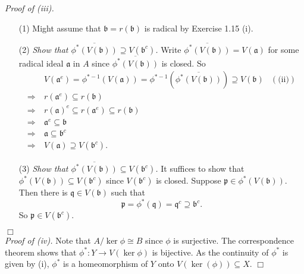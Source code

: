 \documentclass{article}
\begin{document}
\emph{Proof of (iii).}
\begin{enumerate}
\item[(1)]
  Might assume that $\mathfrak{b} = r(\mathfrak{b})$ is radical by Exercise 1.15 (i).

\item[(2)]
  \emph{Show that $\overline{\phi^{*}(V(\mathfrak{b}))} \supseteq V(\mathfrak{b}^{c})$.}
  Write $\overline{\phi^{*}(V(\mathfrak{b}))} = V(\mathfrak{a})$ for some radical ideal $\mathfrak{a}$ in $A$
  since $\overline{\phi^{*}(V(\mathfrak{b}))}$ is closed.
  So
  \begin{align*}
    &\:
    V(\mathfrak{a}^e)
    = \phi^{*-1}(V(\mathfrak{a}))
    = \phi^{*-1}(\overline{\phi^{*}(V(\mathfrak{b}))})
    \supseteq V(\mathfrak{b})
      &(\text{(ii)}) \\
    \Longrightarrow &\:
    r(\mathfrak{a}^e) \subseteq r(\mathfrak{b}) \\
    \Longrightarrow &\:
    r(\mathfrak{a})^e \subseteq r(\mathfrak{a}^e) \subseteq r(\mathfrak{b}) \\
    \Longrightarrow &\:
    \mathfrak{a}^e \subseteq \mathfrak{b} \\
    \Longrightarrow &\:
    \mathfrak{a} \subseteq \mathfrak{b}^c \\
    \Longrightarrow &\:
    V(\mathfrak{a}) \supseteq V(\mathfrak{b}^c).
  \end{align*}

\item[(3)]
  \emph{Show that $\overline{\phi^{*}(V(\mathfrak{b}))} \subseteq V(\mathfrak{b}^{c})$.}
  It suffices to show that $\phi^{*}(V(\mathfrak{b})) \subseteq V(\mathfrak{b}^{c})$
  since $V(\mathfrak{b}^{c})$ is closed.
  Suppose $\mathfrak{p} \in \phi^{*}(V(\mathfrak{b}))$.
  Then there is $\mathfrak{q} \in V(\mathfrak{b})$ such that
  \[
    \mathfrak{p} = \phi^{*}(\mathfrak{q}) = \mathfrak{q}^c \supseteq \mathfrak{b}^c.
  \]
  So $\mathfrak{p} \in V(\mathfrak{b}^c)$.
\end{enumerate}
$\Box$ \\



\emph{Proof of (iv).}
  Note that $A/\ker\phi \cong B$ since $\phi$ is surjective.
  The correspondence theorem shows that
  $\phi^{*}: Y \to V(\ker\phi)$ is bijective.
  As the continuity of $\phi^{*}$ is given by (i),
  $\phi^{*}$ is a homeomorphism of $Y$ onto $V(\ker(\phi)) \subseteq X$.
$\Box$ \\
\end{document}
